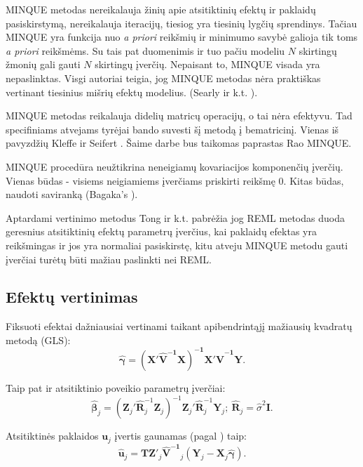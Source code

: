 \documentclass[12pt,a4paper]{article}
\begin{document}
\indent MINQUE metodas nereikalauja žinių apie atsitiktinių efektų ir paklaidų pasiskirstymą, nereikalauja iteracijų, tiesiog yra tiesinių lygčių sprendinys. Tačiau MINQUE yra funkcija nuo \textit{a priori} reikšmių ir minimumo savybė galioja tik toms \textit{a priori} reikšmėms. Su tais pat duomenimis ir tuo pačiu modeliu $N$ skirtingų žmonių gali gauti $N$ skirtingų įverčių. Nepaisant to, MINQUE visada yra nepaslinktas. Visgi autoriai teigia, jog MINQUE metodas nėra praktiškas vertinant tiesinius mišrių efektų modelius. (Searly ir k.t. \cite{minquereml2}).

\indent  MINQUE metodas reikalauja didelių matricų operacijų, o tai nėra efektyvu. Tad specifiniams atvejams tyrėjai bando suvesti šį metodą į bematricinį. Vienas iš pavyzdžių Kleffe ir Seifert \cite{papminque}. Šaime darbe bus taikomas paprastas Rao MINQUE.

\indent MINQUE procedūra neužtikrina neneigiamų kovariacijos komponenčių įverčių. Vienas būdas - visiems neigiamiems įverčiams priskirti reikšmę 0. Kitas būdas, naudoti saviranką (Bagaka's \cite{bagaka}).

\indent Aptardami vertinimo metodus Tong ir k.t.\cite{MLbetterMINQUE} pabrėžia jog REML metodas duoda geresnius atsitiktinių efektų parametrų įverčius, kai paklaidų efektas yra reikšmingas ir jos yra normaliai pasiskirstę, kitu atveju MINQUE metodu gauti įverčiai turėtų būti mažiau paslinkti nei REML.



\subsection{Efektų vertinimas}
\indent Fiksuoti efektai dažniausiai vertinami taikant apibendrintąjį mažiausių kvadratų metodą (GLS):
\begin{equation}\label{eq:gamma}
\boldsymbol{\hat{\gamma}}=\mathbf{\left(X'\hat{V}^{-1}X\right)^{-1}X'\hat{V}^{-1}Y}.
\end{equation}

Taip pat ir atsitiktinio poveikio parametrų įverčiai:
\begin{equation} \label{eq:beta}
\boldsymbol{\hat{\beta}}_j=\left(\mathbf{Z}_j'\mathbf{\hat{R}}^{-1}_j\mathbf{Z}_j\right)^{-1}\mathbf{Z}_j'\mathbf{\hat{R}}^{-1}_j\mathbf{Y}_j;\ \mathbf{\hat{R}}_j=\hat{\sigma}^2\mathbf{I}.
\end{equation}

Atsitiktinės paklaidos $\mathbf{u}_j$ įvertis gaunamas (pagal \cite{EBi}) taip:
\begin{equation}
\mathbf{\hat{u}}_j=\mathbf{TZ}'_j\mathbf{\hat{V}^{-1}}_j\left(\mathbf{Y}_j-\mathbf{X}_j\boldsymbol{\hat{\gamma}}\right).
\end{equation}
\end{document}
